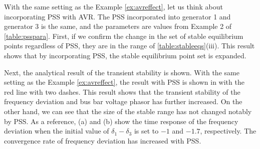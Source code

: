 \documentclass[graybox, envcountchap]{svmult}
\begin{document}
\begin{例}\label{ex:psseffect}
With the same setting as the Example \ref{ex:avreffect}, let us think about incorporating PSS with AVR.
The PSS incorporated into generator 1 and generator 3 is the same, and the parameters are values from Example 2 of \ref{table:psspara}.
First, if we confirm the change in the set of stable equilibrium points regardless of PSS, they are in the range of \ref{table:stableeqs}(iii).
This result shows that by incorporating PSS, the stable equilibrium point set is expanded.

Next, the analytical result of the transient stability is shown.
With the same setting as the Example \ref{ex:avreffect}, the result with PSS is shown in  with the red line with two dashes.
This result shows that the transient stability of the frequency deviation and bus bar voltage phasor has further increased.
On the other hand, we can see that the size of the stable range has not changed notably by PSS.
As a reference,  (a) and (b) show the time response of the frequency deviation when the initial value of $\delta_1-\delta_3$ is set to $-1$ and $-1.
7$, respectively.
The convergence rate of frequency deviation has increased with PSS.
\end{例}
\end{document}
